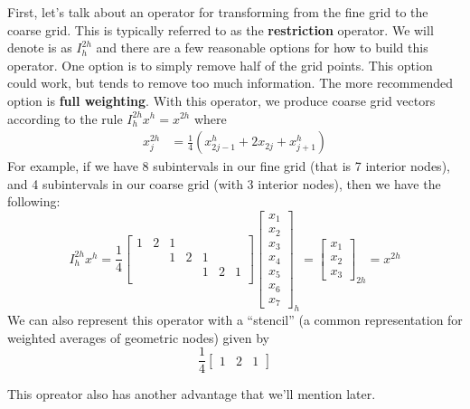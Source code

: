 \documentclass[11pt]{article}
\begin{document}
First, let's talk about an operator for transforming from the fine grid
to the coarse grid. This is typically referred to as the
\textbf{restriction} operator. We will denote is as \(I_h^{2h}\) and
there are a few reasonable options for how to build this operator. One
option is to simply remove half of the grid points. This option could
work, but tends to remove too much information. The more recommended
option is \textbf{full weighting}. With this operator, we produce coarse
grid vectors according to the rule \(I_{h}^{2h} x^{h} = x^{2h}\) where
\begin{align*}
x_{j}^{2h} &= \frac{1}{4} \left( x_{2j-1}^{h} + 2x_{2j} + x_{j+1}^{h} \right)
\end{align*} For example, if we have 8 subintervals in our fine grid
(that is 7 interior nodes), and 4 subintervals in our coarse grid (with
3 interior nodes), then we have the following: \[
I_{h}^{2h} x^{h} = \frac{1}{4} 
\begin{bmatrix}
1 & 2 & 1 &   &   &   & \\
  &   & 1 & 2 & 1 &   & \\
  &   &   &   & 1 & 2 & 1 \\
\end{bmatrix}
\begin{bmatrix}
x_1 \\ x_2 \\ x_3 \\ x_4 \\ x_5 \\ x_6 \\ x_7
\end{bmatrix}_{h}
= \begin{bmatrix}
x_1 \\ x_2 \\ x_3
\end{bmatrix}_{2h} = x^{2h}
\] We can also represent this operator with a ``stencil'' (a common
representation for weighted averages of geometric nodes) given by \[
\frac{1}{4} \begin{bmatrix} 1 & 2 & 1 \end{bmatrix}
\]

This opreator also has another advantage that we'll mention later.
\end{document}
